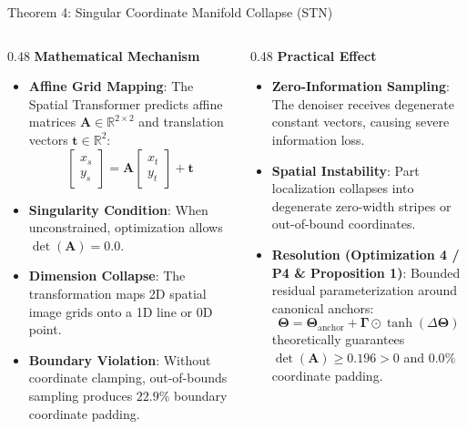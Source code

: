 \documentclass[aspectratio=169,xcolor=dvipsnames]{beamer}
\begin{document}
\begin{frame}{Theorem 4: Singular Coordinate Manifold Collapse (STN)}
\footnotesize
\begin{columns}[t,onlytextwidth]
\begin{column}{0.48\textwidth}
    \textbf{Mathematical Mechanism}
    \begin{itemize}
        \setlength{\itemsep}{0.25em}
        \item \textbf{Affine Grid Mapping}: The Spatial Transformer predicts affine matrices $\mathbf{A} \in \mathbb{R}^{2 \times 2}$ and translation vectors $\mathbf{t} \in \mathbb{R}^2$:
        $$\begin{bmatrix} x_s \\ y_s \end{bmatrix} = \mathbf{A} \begin{bmatrix} x_t \\ y_t \end{bmatrix} + \mathbf{t}$$
        \item \textbf{Singularity Condition}: When unconstrained, optimization allows $\det(\mathbf{A}) = 0.0$.
        \item \textbf{Dimension Collapse}: The transformation maps 2D spatial image grids onto a 1D line or 0D point.
        \item \textbf{Boundary Violation}: Without coordinate clamping, out-of-bounds sampling produces $22.9\%$ boundary coordinate padding.
    \end{itemize}
\end{column}
\begin{column}{0.48\textwidth}
    \textbf{Practical Effect}
    \begin{itemize}
        \setlength{\itemsep}{0.25em}
        \item \textbf{Zero-Information Sampling}: The denoiser receives degenerate constant vectors, causing severe information loss.
        \item \textbf{Spatial Instability}: Part localization collapses into degenerate zero-width stripes or out-of-bound coordinates.
        \item \textbf{Resolution (Optimization 4 / P4 \& Proposition 1)}: Bounded residual parameterization around canonical anchors:
        $$\boldsymbol{\Theta} = \boldsymbol{\Theta}_{\text{anchor}} + \boldsymbol{\Gamma} \odot \tanh(\Delta \boldsymbol{\Theta})$$
        theoretically guarantees $\det(\mathbf{A}) \ge 0.196 > 0$ and $0.0\%$ coordinate padding.
    \end{itemize}
\end{column}
\end{columns}
\end{frame}
\end{document}
